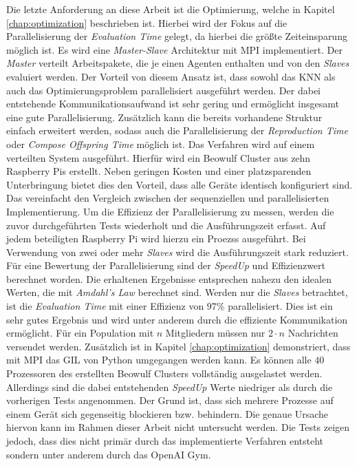 Die letzte Anforderung an diese Arbeit ist die Optimierung, welche in Kapitel \ref{chap:optimization} beschrieben ist. Hierbei wird der Fokus auf die Parallelisierung der \emph{Evaluation Time} gelegt, da hierbei die größte Zeiteinsparung möglich ist. Es wird eine \emph{Master-Slave} Architektur mit \ac{MPI} implementiert. Der \emph{Master} verteilt Arbeitspakete, die je einen Agenten enthalten und von den \emph{Slaves} evaluiert werden. Der Vorteil von diesem Ansatz ist, dass sowohl das \ac{KNN} als auch das Optimierungsproblem parallelisiert ausgeführt werden. Der dabei entstehende Kommunikationsaufwand ist sehr gering und ermöglicht insgesamt eine gute Parallelisierung. Zusätzlich kann die bereits vorhandene Struktur einfach erweitert werden, sodass auch die Parallelisierung der \emph{Reproduction Time} oder \emph{Compose Offspring Time} möglich ist. Das Verfahren wird auf einem verteilten System ausgeführt. Hierfür wird ein Beowulf Cluster aus zehn Raspberry Pis erstellt. Neben geringen Kosten und einer platzsparenden Unterbringung bietet dies den Vorteil, dass alle Geräte identisch konfiguriert sind. Das vereinfacht den Vergleich zwischen der sequenziellen und parallelisierten Implementierung. Um die Effizienz der Parallelisierung zu messen, werden die zuvor durchgeführten Tests wiederholt und die Ausführungszeit erfasst. Auf jedem beteiligten Raspberry Pi wird hierzu ein Proezss ausgeführt. Bei Verwendung von zwei oder mehr \emph{Slaves} wird die Ausführungszeit stark reduziert. Für eine Bewertung der Parallelisierung sind der \emph{SpeedUp} und Effizienzwert berechnet worden. Die erhaltenen Ergebnisse entsprechen nahezu den idealen Werten, die mit \emph{Amdahl's Law} berechnet sind. Werden nur die \emph{Slaves} betrachtet, ist die \emph{Evaluation Time} mit einer Effizienz von $97\%$ parallelisiert. Dies ist ein sehr gutes Ergebnis und wird unter anderem durch die effiziente Kommunikation ermöglicht. Für ein Population mit $n$ Mitgliedern müssen nur $2 \cdot n$ Nachrichten versendet werden. Zusätzlich ist in Kapitel \ref{chap:optimization} demonstriert, dass mit \ac{MPI} das \ac{GIL} von Python umgegangen werden kann. Es können alle $40$ Prozessoren des erstellten Beowulf Clusters vollständig ausgelastet werden. Allerdings sind die dabei entstehenden \emph{SpeedUp} Werte niedriger als durch die vorherigen Tests angenommen. Der Grund ist, dass sich mehrere Prozesse auf einem Gerät sich gegenseitig blockieren bzw. behindern. Die genaue Ursache hiervon kann im Rahmen dieser Arbeit nicht untersucht werden. Die Tests zeigen jedoch, dass dies nicht primär durch das implementierte Verfahren entsteht sondern unter anderem durch das OpenAI Gym.
